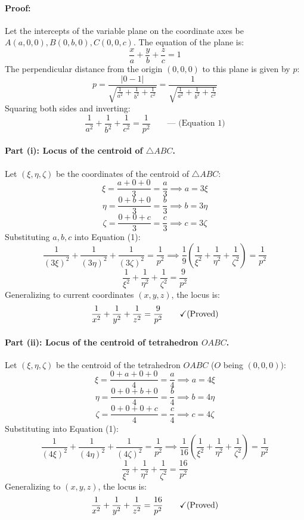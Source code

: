 \documentclass[11pt,a4paper]{article}
\begin{document}
\paragraph{Proof:}
Let the intercepts of the variable plane on the coordinate axes be $A(a, 0, 0), B(0, b, 0), C(0, 0, c)$. The equation of the plane is:
$$\frac{x}{a} + \frac{y}{b} + \frac{z}{c} = 1$$
The perpendicular distance from the origin $(0, 0, 0)$ to this plane is given by $p$:
$$p = \frac{|0 - 1|}{\sqrt{\frac{1}{a^2} + \frac{1}{b^2} + \frac{1}{c^2}}} = \frac{1}{\sqrt{\frac{1}{a^2} + \frac{1}{b^2} + \frac{1}{c^2}}}$$
Squaring both sides and inverting:
$$\frac{1}{a^2} + \frac{1}{b^2} + \frac{1}{c^2} = \frac{1}{p^2} \qquad \text{--- (Equation 1)}$$

\paragraph{Part (i): Locus of the centroid of $\triangle ABC$.}
Let $(\xi, \eta, \zeta)$ be the coordinates of the centroid of $\triangle ABC$:
$$\xi = \frac{a + 0 + 0}{3} = \frac{a}{3} \implies a = 3\xi$$
$$\eta = \frac{0 + b + 0}{3} = \frac{b}{3} \implies b = 3\eta$$
$$\zeta = \frac{0 + 0 + c}{3} = \frac{c}{3} \implies c = 3\zeta$$
Substituting $a, b, c$ into Equation (1):
$$\frac{1}{(3\xi)^2} + \frac{1}{(3\eta)^2} + \frac{1}{(3\zeta)^2} = \frac{1}{p^2} \implies \frac{1}{9}\left(\frac{1}{\xi^2} + \frac{1}{\eta^2} + \frac{1}{\zeta^2}\right) = \frac{1}{p^2}$$
$$\frac{1}{\xi^2} + \frac{1}{\eta^2} + \frac{1}{\zeta^2} = \frac{9}{p^2}$$
Generalizing to current coordinates $(x, y, z)$, the locus is:
$$\frac{1}{x^2} + \frac{1}{y^2} + \frac{1}{z^2} = \frac{9}{p^2} \qquad \text{\checkmark (Proved)}$$

\paragraph{Part (ii): Locus of the centroid of tetrahedron $OABC$.}
Let $(\xi, \eta, \zeta)$ be the centroid of the tetrahedron $OABC$ ($O$ being $(0,0,0)$):
$$\xi = \frac{0 + a + 0 + 0}{4} = \frac{a}{4} \implies a = 4\xi$$
$$\eta = \frac{0 + 0 + b + 0}{4} = \frac{b}{4} \implies b = 4\eta$$
$$\zeta = \frac{0 + 0 + 0 + c}{4} = \frac{c}{4} \implies c = 4\zeta$$
Substituting into Equation (1):
$$\frac{1}{(4\xi)^2} + \frac{1}{(4\eta)^2} + \frac{1}{(4\zeta)^2} = \frac{1}{p^2} \implies \frac{1}{16}\left(\frac{1}{\xi^2} + \frac{1}{\eta^2} + \frac{1}{\zeta^2}\right) = \frac{1}{p^2}$$
$$\frac{1}{\xi^2} + \frac{1}{\eta^2} + \frac{1}{\zeta^2} = \frac{16}{p^2}$$
Generalizing to $(x, y, z)$, the locus is:
$$\frac{1}{x^2} + \frac{1}{y^2} + \frac{1}{z^2} = \frac{16}{p^2} \qquad \text{\checkmark (Proved)}$$
\end{document}
